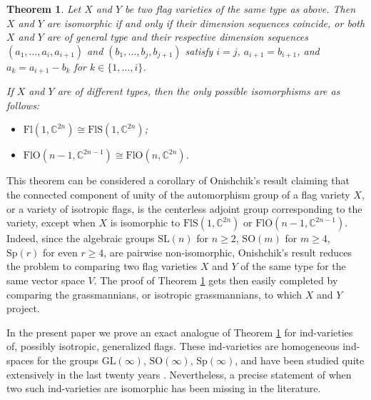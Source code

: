 \documentclass[12pt]{amsart}
\newtheorem{theorem}{Theorem}[section]
\theoremstyle{definition}
\newcommand{\GL}{\mathrm{GL}}
\begin{document}
\begin{theorem}
\label{th-intro}
Let $X$ and $Y$ be two flag varieties of the same type as above. Then $X$ and $Y$ are isomorphic if and only if their dimension sequences coincide, or both $X$ and $Y$ are of general type and their respective dimension sequences $(a_1,\ldots,a_i,a_{i+1})$ and $(b_1,\ldots,b_j,b_{j+1})$ satisfy $i=j$, $a_{i+1}=b_{i+1}$, and $a_k=a_{i+1}-b_k$ for $k\in\{1,\ldots,i\}$.

If $X$ and $Y$ are of different types, then the only possible isomorphisms are as follows:
\begin{itemize}
\item $\mathrm{Fl}(1,\mathbb{C}^{2n})\cong\mathrm{FlS}(1,\mathbb{C}^{2n})$;
\item $\mathrm{FlO}(n-1,\mathbb{C}^{2n-1})\cong\mathrm{FlO}(n,\mathbb{C}^{2n})$.
\end{itemize}
\end{theorem}


This theorem can be considered a corollary of Onishchik's result \cite{O}
claiming  that the connected component of unity of the automorphism group of a flag variety $X$, or  a variety of isotropic flags, is the centerless adjoint group corresponding to the variety, except when $X$ is isomorphic to $\mathrm{FlS}(1,\mathbb{C}^{2n})$
or $\mathrm{FlO}(n-1,\mathbb{C}^{2n-1})$. Indeed, since the algebraic groups $\mathrm{SL}(n)$ for $n\geq 2$, $\mathrm{SO}(m)$ for $m\geq 4$, $\mathrm{Sp}(r)$ for even $r\geq 4$, 
are pairwise non-isomorphic, Onishchik's result reduces the problem to comparing two flag varieties $X$ and $Y$ of the same type for the same vector space $V$. The proof of Theorem \ref{th-intro} gets then easily completed by comparing the grassmannians, or isotropic grassmannians, to which $X$ and $Y$ project.


In the present paper we prove an exact analogue of Theorem \ref{th-intro} for ind-varieties of, possibly isotropic, generalized flags. These ind-varieties are homogeneous ind-spaces for the groups $\GL(\infty)$, $\mathrm{SO}(\infty)$, $\mathrm{Sp}(\infty)$, and have been studied quite extensively in the last twenty years \cite{Dimitrov-Penkov,DPW,IP,HP,PT1,PT}. Nevertheless, a precise statement of when two such ind-varieties are isomorphic has been  missing in the literature. 
\end{document}
